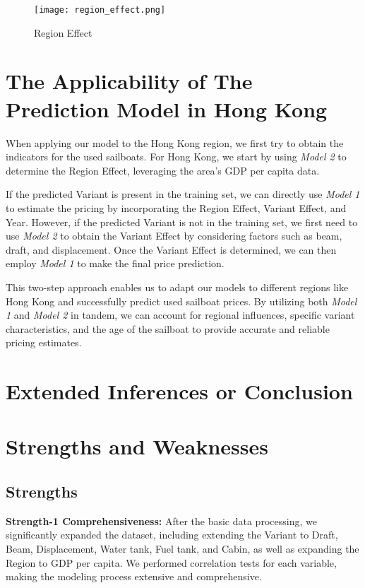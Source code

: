\documentclass[12pt]{article}  %
\begin{document}
\begin{figure}[htbp]
    \centering
    \texttt{[image: region\_effect.png]}
    \caption{Region Effect}\label{fig:region_effect}
\end{figure}


\section{The Applicability of The Prediction Model in Hong Kong}
When applying our model to the Hong Kong region, 
we first try to obtain the indicators for the used sailboats. 
For Hong Kong, we start by using \emph{Model 2} to determine the Region Effect, leveraging the area's GDP per capita data.

If the predicted Variant is present in the training set, 
we can directly use \emph{Model 1} to estimate the pricing by incorporating the Region Effect, Variant Effect, and Year. 
However, if the predicted Variant is not in the training set, we first need to use \emph{Model 2} to obtain the Variant Effect by considering factors such as beam, draft, and displacement. 
Once the Variant Effect is determined, we can then employ \emph{Model 1} to make the final price prediction.

This two-step approach enables us to adapt our models to different regions like Hong Kong and successfully predict used sailboat prices. 
By utilizing both \emph{Model 1} and \emph{Model 2} in tandem, we can account for regional influences, specific variant characteristics, 
and the age of the sailboat to provide accurate and reliable pricing estimates.



\section{Extended Inferences or Conclusion}


\section{Strengths and Weaknesses}
\subsection{Strengths}

\textbf{Strength-1 Comprehensiveness:}
After the basic data processing, we significantly expanded the dataset, including extending the Variant to Draft, Beam, Displacement, Water tank, Fuel tank, and Cabin, as well as expanding the Region to GDP per capita. We performed correlation tests for each variable, making the modeling process extensive and comprehensive.
\end{document}
